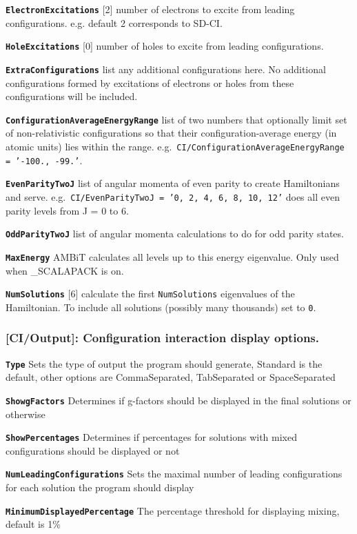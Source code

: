\documentclass[a4paper,11pt]{article}
\newcommand{\option}[1]{\smallskip\noindent\textbf{\texttt{#1}}}
\newcommand{\code}[1]{\texttt{#1}}
\begin{document}
{\option{ElectronExcitations} [2] number of electrons to excite from leading configurations. e.g. default 2 corresponds to SD-CI.

\option{HoleExcitations} [0] number of holes to excite from leading configurations.

\option{ExtraConfigurations} list any additional configurations here. No additional configurations formed by excitations of electrons or holes from these configurations will be included.

\option{ConfigurationAverageEnergyRange} list of two numbers that optionally limit set of non-relativistic configurations so that their configuration-average energy (in atomic units) lies within the range. e.g.~\code{CI/ConfigurationAverageEnergyRange = '-100., -99.'}.

\option{EvenParityTwoJ} list of angular momenta of even parity to create Hamiltonians and serve. e.g.~\texttt{CI/EvenParityTwoJ = '0, 2, 4, 6, 8, 10, 12'} does all even parity levels from J = 0 to 6.

\option{OddParityTwoJ} list of angular momenta calculations to do for odd parity states.

\option{MaxEnergy} AMBiT calculates all levels up to this energy eigenvalue. Only used when \_SCALAPACK is on.

\option{NumSolutions} [6] calculate the first \texttt{NumSolutions} eigenvalues of the Hamiltonian. To include all solutions (possibly many thousands) set to \code{0}.

\subsubsection{[CI/Output]: Configuration interaction display options.}

\option{Type} Sets the type of output the program should generate, Standard is the default, other options are CommaSeparated, TabSeparated or SpaceSeparated

\option{ShowgFactors} Determines if g-factors should be displayed in the final solutions or otherwise

\option{ShowPercentages} Determines if percentages for solutions with mixed configurations should be displayed or not

\option{NumLeadingConfigurations} Sets the maximal number of leading configurations for each solution the program should display

\option{MinimumDisplayedPercentage} The percentage threshold for displaying mixing, default is 1\%

}
\end{document}
